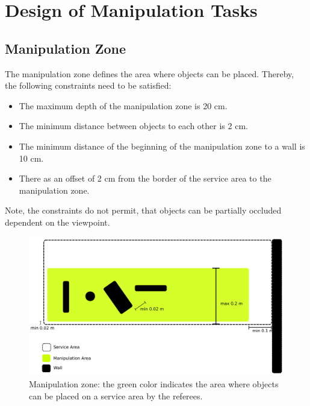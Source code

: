 \section{Design of Manipulation Tasks} \label{sec:ManipulationTasks}


\subsection{Manipulation Zone} \label{ssec:ManipulationZone}
The manipulation zone defines the area where objects can be placed. Thereby, the following constraints need to be satisfied:
\begin{itemize}
	\item The maximum depth of the manipulation zone is 20 cm.
	\item The minimum distance between objects to each other is 2 cm.
	\item The minimum distance of the beginning of the manipulation zone to a wall is 10 cm.
	\item There as an offset of 2 cm from the border of the service area to the manipulation zone.
\end{itemize}
Note, the constraints do not permit, that objects can be partially occluded dependent on the viewpoint.
\begin{figure} [h!]
\centering
\includegraphics[width=1.0\textwidth ]{./images/manipulation_zone.pdf}
\caption{Manipulation zone: the green color indicates the area where objects can be placed on a service area by the referees.}
\label{fig:manipulation_zone}
\end{figure}


